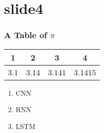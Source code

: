 \documentclass[xcolor=dvipsnames]{beamer}
\begin{document}
        \section{slide4}
        \begin{frame}[t]
            \frametitle{A Table of $\pi$}
            \centering
            \begin{tabular}{|c|c|c|c|} \hline
                1 & 2 & 3 & 4 \\ \hline
                3.1 & 3.14 & 3.141 & 3.1415 \\ \hline
            \end{tabular}
            \begin{enumerate}
                \centering
                \item CNN
                \item RNN
                \item LSTM
            \end{enumerate}
        \end{frame}

    
\end{document}
